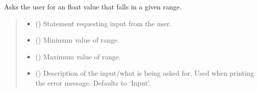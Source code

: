 \documentclass[letterpaper,10pt,english]{sphinxmanual}
\begin{document}
\begin{fulllineitems}

\begin{fulllineitems}
\label{\detokenize{GetUserInput:GetUserInput.UserInput.AskForFloatInRange}}
\pysigstartsignatures
{}
\pysigstopsignatures
\sphinxAtStartPar
Asks the user for an float value that falls in a given range.
\begin{quote}\begin{description}
\begin{itemize}
\item {} 
\sphinxAtStartPar
{} () \textendash{} Statement requesting input from the user.

\item {} 
\sphinxAtStartPar
{} () \textendash{} Minimum value of range.

\item {} 
\sphinxAtStartPar
{} () \textendash{} Maximum value of range.

\item {} 
\sphinxAtStartPar
{} (\sphinxstyleliteralemphasis{\sphinxupquote{, }}) \textendash{} Description of the input/what is being asked for. Used when printing                 the error message. Defaults to ‘Input’.


\end{itemize}
\end{description}
\end{quote}
\end{fulllineitems}
\end{fulllineitems}
\end{document}
